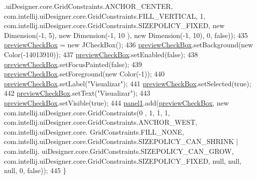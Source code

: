\begin{DoxyCode}
      .uiDesigner.core.GridConstraints.ANCHOR\_CENTER, com.intellij.uiDesigner.core.GridConstraints.FILL\_VERTICAL, 
      1, com.intellij.uiDesigner.core.GridConstraints.SIZEPOLICY\_FIXED, \textcolor{keyword}{new} Dimension(-1, 5), \textcolor{keyword}{new} Dimension(-1, 10
      ), \textcolor{keyword}{new} Dimension(-1, 10), 0, \textcolor{keyword}{false}));
435         \hyperlink{classpresentacion_1_1form_1_1mainForm_a0dbe9873e69c0702a519d1cd171594c0}{previewCheckBox} = \textcolor{keyword}{new} JCheckBox();
436         \hyperlink{classpresentacion_1_1form_1_1mainForm_a0dbe9873e69c0702a519d1cd171594c0}{previewCheckBox}.setBackground(\textcolor{keyword}{new} Color(-14013910));
437         \hyperlink{classpresentacion_1_1form_1_1mainForm_a0dbe9873e69c0702a519d1cd171594c0}{previewCheckBox}.setEnabled(\textcolor{keyword}{false});
438         \hyperlink{classpresentacion_1_1form_1_1mainForm_a0dbe9873e69c0702a519d1cd171594c0}{previewCheckBox}.setFocusPainted(\textcolor{keyword}{false});
439         \hyperlink{classpresentacion_1_1form_1_1mainForm_a0dbe9873e69c0702a519d1cd171594c0}{previewCheckBox}.setForeground(\textcolor{keyword}{new} Color(-1));
440         \hyperlink{classpresentacion_1_1form_1_1mainForm_a0dbe9873e69c0702a519d1cd171594c0}{previewCheckBox}.setLabel(\textcolor{stringliteral}{"Visualizar"});
441         \hyperlink{classpresentacion_1_1form_1_1mainForm_a0dbe9873e69c0702a519d1cd171594c0}{previewCheckBox}.setSelected(\textcolor{keyword}{true});
442         \hyperlink{classpresentacion_1_1form_1_1mainForm_a0dbe9873e69c0702a519d1cd171594c0}{previewCheckBox}.setText(\textcolor{stringliteral}{"Visualizar"});
443         \hyperlink{classpresentacion_1_1form_1_1mainForm_a0dbe9873e69c0702a519d1cd171594c0}{previewCheckBox}.setVisible(\textcolor{keyword}{true});
444         \hyperlink{classpresentacion_1_1form_1_1mainForm_aa43e009cc6dc09d4e637385fbd361510}{panel1}.add(\hyperlink{classpresentacion_1_1form_1_1mainForm_a0dbe9873e69c0702a519d1cd171594c0}{previewCheckBox}, \textcolor{keyword}{new} com.intellij.uiDesigner.core.GridConstraints(0
      , 1, 1, 1, com.intellij.uiDesigner.core.GridConstraints.ANCHOR\_WEST, com.intellij.uiDesigner.core.
      GridConstraints.FILL\_NONE, com.intellij.uiDesigner.core.GridConstraints.SIZEPOLICY\_CAN\_SHRINK | com.intellij.
      uiDesigner.core.GridConstraints.SIZEPOLICY\_CAN\_GROW, com.intellij.uiDesigner.core.GridConstraints.SIZEPOLICY\_FIXED, 
      null, null, null, 0, \textcolor{keyword}{false}));
445     \}
\end{DoxyCode}
\mbox{\label{classpresentacion_1_1form_1_1mainForm_a5db496bbae052ad3d04d03e194db82e4}} 

